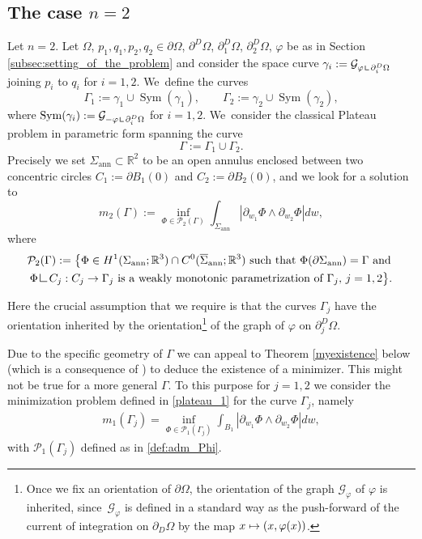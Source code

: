 \documentclass[JEP,XML,SOM,Unicode, NoFloatCountersInSection,published]{cedram}
\newcommand\mto{\mathchoice{\longmapsto}{\mapsto}{\mapsto}{\mapsto}}
\DeclareMathOperator{\Sym}{Sym}
\newcommand{\R}{\mathbb{R}}
\let\Om\Omega
\newcommand{\openannulus}{\Sigma_\mathrm{ann}}
\newcommand{\resa}{\mathop{\hbox{\vrule height 7pt width 0.5pt depth 0pt
\vrule height 0.5pt width 6pt depth 0pt}}\nolimits}
\newcommand{\resb}{\mathop{\hbox{\vrule height 4pt width 0.5pt depth 0pt
\vrule height 0.5pt width 3pt depth 0pt}}\nolimits}
\newcommand{\res}{\mathchoice{\resa}{\resa}{\resb}{\resb}}
\theoremstyle{definition}
\begin{document}
\subsection{The case $n=2$}\label{sec:the_case_n=2}
Let $n=2$. Let $\Om$, $p_1,q_1,p_2,q_2\in\partial\Om$, $\partial^D\Om$, $\partial_1^D\Om$, $\partial_2^D\Om$, $\varphi$ be as in Section \ref{subsec:setting_of_the_problem} and
consider the space curve $\gamma_i:=\mathcal{G}_{\varphi\res\partial_i^D\Om}$ joining $p_i$ to $q_i$ for $i=1,2$. We~define the curves
\begin{equation*}
\Gamma_1:=\gamma_1\cup\Sym(\gamma_1),\qquad \Gamma_2:=\gamma_2\cup\Sym(\gamma_2),
\end{equation*}
where $\Sym(\gamma_i):=\mathcal{G}_{-\varphi\res\partial_i^D\Om}$ for $i=1,2$. We~consider the
classical Plateau problem in parametric form spanning the curve
\[
\Gamma:=\Gamma_1\cup\Gamma_2.
\]
Precisely we set $\openannulus\subset\R^2$ to be an open annulus
enclosed between two concentric circles { $C_1:=\partial B_1(0)$ and $C_2:=\partial B_2(0)$},
and we look for a solution to
\begin{equation}\label{catenoid_plateau}
m_2(\Gamma):=\inf_{\Phi\in\mathcal{P}_2(\Gamma)}\int_{\openannulus}|\partial_{w_1}\Phi\wedge\partial_{w_2}\Phi|dw,
\end{equation}
where
\begin{multline*}
\mathcal{P}_2(\Gamma):=\big\{\Phi\in H^1(\openannulus;\R^3)\cap C^0(\overline\Sigma_\mathrm{ann};\R^3) \text{ such that }\Phi(\partial \openannulus)=\Gamma\text{ and }\\
\Phi\res C_j:C_j\to \Gamma_j\text{ is a weakly monotonic parametrization of $\Gamma_j$, $j=1,2$}\big\}.
\end{multline*}

Here the crucial assumption that we require is that the curves $\Gamma_j$
have the orientation inherited by the orientation\footnote{Once we fix
an orientation of $\partial \Omega$, the orientation of the graph
$\mathcal G_\varphi$
of $\varphi$ is inherited, since~$\mathcal G_\varphi$
is defined in a standard way as the push-forward of the current of integration on $\partial_D\Om$ by the map $x\mto(x,\varphi(x))$.} of the graph of $\varphi$ on $\partial_j^D\Om$.

Due to the specific geometry of $\Gamma$ we can appeal to Theorem \ref{myexistence} below (which is a consequence of \cite[Th.\,1 \& Th.\,5]{MY}) to deduce the existence of a minimizer. This might not be true for a more general $\Gamma$. To this purpose for $j=1,2$ we consider
the minimization problem defined in \eqref{plateau_1} for the curve $\Gamma_j$, namely
\begin{align}\label{minimizationSigma}
m_1(\Gamma_j)=\inf_{\Phi\in\mathcal{P}_1(\Gamma_j)}\int_{B_1}|\partial_{w_1}\Phi\wedge\partial_{w_2}\Phi|dw,
\end{align}
with $\mathcal{P}_1(\Gamma_j)$ defined as in \eqref{def:adm_Phi}.
\end{document}
